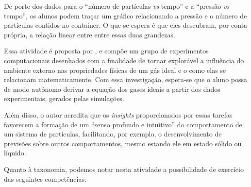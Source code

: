 De porte dos dados para o ``número de partículas \textit{vs} tempo'' e a ``pressão \textit{vs} tempo'', os alunos podem traçar um gráfico relacionando a pressão e o número de partículas contidos no container. O que se espera é que eles descubram, por conta própria, a relação linear entre entre essas duas grandezas.

Essa atividade é proposta por , e compõe um grupo de experimentos computacionais desenhados com a finalidade de tornar explorável a influência do ambiente externo nas propriedades físicas de um gás ideal e o como elas se relacionam matematicamente. Com essa investigação, espera-se que o aluno possa de modo autônomo derivar a equação dos gases ideais a partir dos dados experimentais, gerados pelas simulações.

Além disso, o autor acredita que os \textit{insights} proporcionados por essas tarefas favorecem a formação de um ``senso profundo e intuitivo'' do comportamento de um sistema de partículas, facilitando, por exemplo, o desenvolvimento de previsões sobre outros comportamentos, mesmo estando ele em estado sólido ou líquido. 

Quanto à taxonomia, podemos notar nesta atividade a possibilidade de exercício das seguintes competências:

\vspace{0.5cm}

